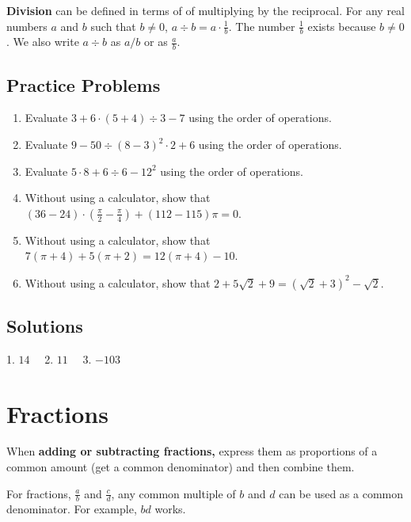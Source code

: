 \documentclass[11pt]{book}               %
\begin{document}
\textbf{Division} can be defined in terms of of multiplying by the reciprocal.
For any real numbers $a$ and $b$ such that $b \neq 0$,  $a \div b=a \cdot \frac{1}{b}$.
The number $\frac{1}{b}$ exists because $b \neq 0$.
We also write $a \div b$ as $a / b$ or as $\frac{a}{b}$.

\subsection{Practice Problems}

\begin{enumerate}
    \item Evaluate $3 + 6 \cdot (5 + 4) \div 3 - 7$ using the order of operations. %
    \item Evaluate $9 - 50 \div (8 - 3)^2 \cdot 2 + 6$ using the order of operations. %
    \item Evaluate $5 \cdot 8 + 6 \div 6 - 12 ^ 2$  using the order of operations. %
    \item Without using a calculator, show that $(36-24)\cdot\left(\frac{\pi}{2} -\frac{\pi}{4}\right) + (112 - 115)\pi = 0$.
    \item Without using a calculator, show that $7\left(\pi+4\right) + 5\left(\pi+2\right)=12\left(\pi+4\right)-10$.
    \item Without using a calculator, show that $2+5\sqrt{2}+9=\left(\sqrt{2}+3\right)^2-\sqrt{2}$.
\end{enumerate}

\subsection{Solutions}

1.  $14 \quad$ 2. $11 \quad$ 3.  $-103$

\newpage

\label{section-fractions}
\section{Fractions}
When {\bf adding or subtracting fractions,} express them as proportions of a common amount (get a common denominator) and then combine them.

For fractions, $\frac{a}{b}$ and $\frac{c}{d}$, any common multiple of $b$ and $d$ can be used as a common denominator. For example, $bd$ works. 
\end{document}
